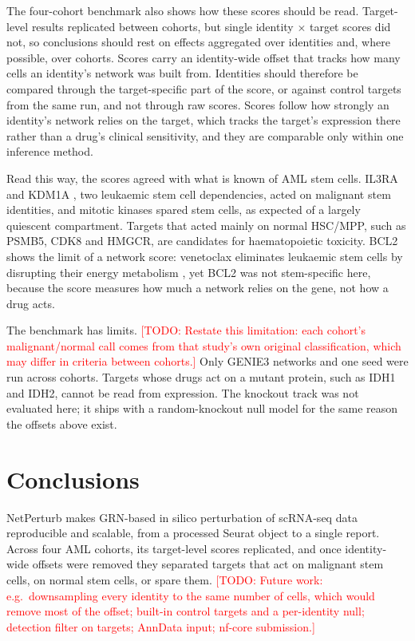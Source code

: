 \documentclass[pdflatex,sn-vancouver-num]{sn-jnl}%
\newcommand{\todo}[1]{\textcolor{red}{[TODO: #1]}}
\begin{document}
The four-cohort benchmark also shows how these scores should be read. Target-level results replicated between cohorts, but single identity $\times$ target scores did not, so conclusions should rest on effects aggregated over identities and, where possible, over cohorts. Scores carry an identity-wide offset that tracks how many cells an identity's network was built from. Identities should therefore be compared through the target-specific part of the score, or against control targets from the same run, and not through raw scores. Scores follow how strongly an identity's network relies on the target, which tracks the target's expression there rather than a drug's clinical sensitivity, and they are comparable only within one inference method.

Read this way, the scores agreed with what is known of AML stem cells. IL3RA \citep{Jordan2000cd123} and KDM1A \citep{Harris2012kdm1a}, two leukaemic stem cell dependencies, acted on malignant stem identities, and mitotic kinases spared stem cells, as expected of a largely quiescent compartment. Targets that acted mainly on normal HSC/MPP, such as PSMB5, CDK8 and HMGCR, are candidates for haematopoietic toxicity. BCL2 shows the limit of a network score: venetoclax eliminates leukaemic stem cells by disrupting their energy metabolism \citep{Pollyea2018venetoclax}, yet BCL2 was not stem-specific here, because the score measures how much a network relies on the gene, not how a drug acts.

The benchmark has limits. \todo{Restate this limitation: each cohort's malignant/normal call comes from that study's own original classification, which may differ in criteria between cohorts.} Only GENIE3 networks and one seed were run across cohorts. Targets whose drugs act on a mutant protein, such as IDH1 and IDH2, cannot be read from expression. The knockout track was not evaluated here; it ships with a random-knockout null model for the same reason the offsets above exist.

\section{Conclusions}\label{sec:conclusions}

NetPerturb makes GRN-based in silico perturbation of scRNA-seq data reproducible and scalable, from a processed Seurat object to a single report. Across four AML cohorts, its target-level scores replicated, and once identity-wide offsets were removed they separated targets that act on malignant stem cells, on normal stem cells, or spare them. \todo{Future work: e.g.\ downsampling every identity to the same number of cells, which would remove most of the offset; built-in control targets and a per-identity null; detection filter on targets; AnnData input; nf-core submission.}
\end{document}

